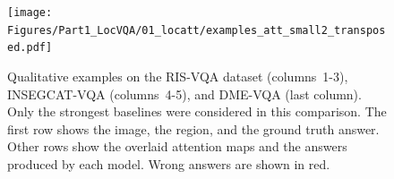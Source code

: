 
\begin{figure}[!t]
\begin{center}
\texttt{[image: Figures/Part1\_LocVQA/01\_locatt/examples\_att\_small2\_transposed.pdf]}
\caption{Qualitative examples on the RIS-VQA dataset (columns~1-3), INSEGCAT-VQA (columns~4-5), and DME-VQA (last column). Only the strongest baselines were considered in this comparison. The first row shows the image, the region, and the ground truth answer. Other rows show the overlaid attention maps and the answers produced by each model. Wrong answers are shown in red.}
\label{fig:examples_att}
\end{center}
\end{figure}
